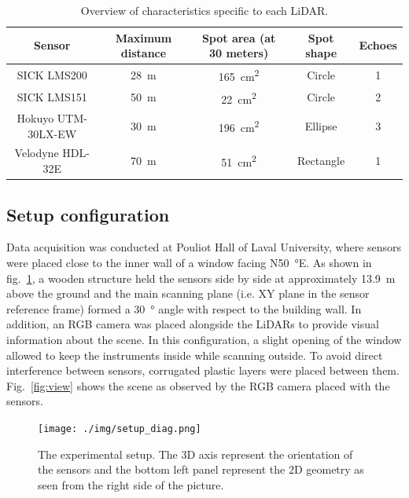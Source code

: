 \begin{table}[htbp]
    \centering
    \begin{tabular}{|c|c|c|c|c|}
        \hline
        \textbf{Sensor}     & \textbf{Maximum distance}  & \textbf{Spot area (at 30 meters)}  & \textbf{Spot shape} & \textbf{Echoes} \\\hline
        SICK LMS200         & \SI{28}{\meter}            & \SI{165}{\centi\meter\squared}     & Circle              & 1               \\\hline
        SICK LMS151         & \SI{50}{\meter}            & \SI{22}{\centi\meter\squared}      & Circle              & 2               \\\hline
        Hokuyo UTM-30LX-EW  & \SI{30}{\meter}            & \SI{196}{\centi\meter\squared}     & Ellipse             & 3               \\\hline
        Velodyne HDL-32E    & \SI{70}{\meter}            & \SI{51}{\centi\meter\squared}      & Rectangle           & 1               \\\hline
    \end{tabular}
    \caption{Overview of characteristics specific to each LiDAR.}
    \label{tab:lidars}
\end{table}

\subsection{Setup configuration}

Data acquisition was conducted at Pouliot Hall of Laval University, where sensors were placed close to the inner wall of a window facing N\SI{50}{\degree}E. As shown in fig.~\ref{fig:setup}, a wooden structure held the sensors side by side at approximately \SI{13.9}{\meter} above the ground and the main scanning plane (i.e. XY plane in the sensor reference frame) formed a \SI{30}{\degree} angle with respect to the building wall. In addition, an RGB camera was placed alongside the LiDARs to provide visual information about the scene. In this configuration, a slight opening of the window allowed to keep the instruments inside while scanning outside. To avoid direct interference between sensors, corrugated plastic layers were placed between them. Fig.~\ref{fig:view} shows the scene as observed by the RGB camera placed with the sensors.

\begin{figure}[th]
    \centering
    \texttt{[image: ./img/setup\_diag.png]}
    \caption{The experimental setup. The 3D axis represent the orientation of the sensors and the bottom left panel represent the 2D geometry as seen from the right side of the picture.}
    \label{fig:setup}
\end{figure}

